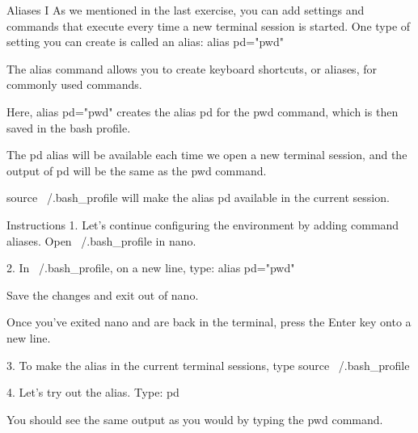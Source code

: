 Aliases I
    As we mentioned in the last exercise, you can add settings and commands that execute every time a new terminal session is started. One type of setting you can create is called an alias:   
        alias pd="pwd"
    
    The alias command allows you to create keyboard shortcuts, or aliases, for commonly used commands.

    Here, alias pd="pwd" creates the alias pd for the pwd command, which is then saved in the bash profile.

    The pd alias will be available each time we open a new terminal session, and the output of pd will be the same as the pwd command.

    source ~/.bash_profile will make the alias pd available in the current session.

Instructions
    1.
    Let’s continue configuring the environment by adding command aliases.
    Open ~/.bash_profile in nano.

    2.
    In ~/.bash_profile, on a new line, type:
        alias pd="pwd"

    Save the changes and exit out of nano.

    Once you’ve exited nano and are back in the terminal, press the Enter key onto a new line.

    3.
    To make the alias in the current terminal sessions, type
        source ~/.bash_profile

    4.
    Let’s try out the alias. Type:
        pd 
        
    You should see the same output as you would by typing the pwd command.